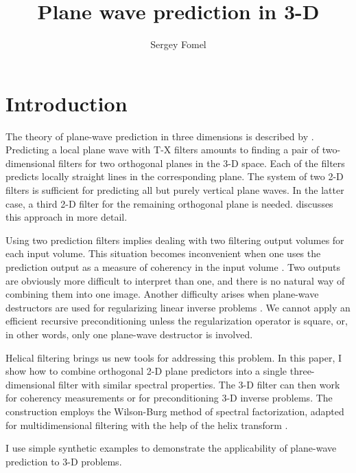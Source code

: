 
\title{Plane wave prediction in 3-D}


\author{Sergey Fomel}

\shortpaper
\maketitle

\section{Introduction}

The theory of plane-wave prediction in three dimensions is described
by \cite{Claerbout.sep.77.19,gee}. Predicting a local plane wave with
T-X filters amounts to finding a pair of two-dimensional filters
for two orthogonal planes in the 3-D space.  Each of the filters
predicts locally straight lines in the corresponding plane. The system
of two 2-D filters is sufficient for predicting all but purely
vertical plane waves. In the latter case, a third 2-D filter for the
remaining orthogonal plane is needed.  \cite{Schwab.sepphd.99}
discusses this approach in more detail.
\par
Using two prediction filters implies dealing with two filtering output
volumes for each input volume. This situation becomes inconvenient
when one
uses the prediction output as a measure of coherency in the input
volume \cite[]{Claerbout.sep.77.19,Schwab.sep.92.29}. Two outputs are
obviously more difficult to interpret than one, and there is no
natural way of combining them into one image. Another difficulty
arises when plane-wave destructors are used for regularizing linear
inverse problems \cite[]{Clapp.sep.95.bob1}. We cannot
apply an efficient recursive preconditioning
\cite[]{Claerbout.sep.97.jon2} unless the regularization operator is
square, or, in other words, only one plane-wave destructor is involved.
\par
Helical filtering \cite[]{GEO63-05-15321541} brings us new tools for
addressing this problem. In this paper, I show how to combine
orthogonal 2-D plane predictors into a single three-dimensional filter
with similar spectral properties. The 3-D filter can then work for
coherency measurements or for preconditioning 3-D inverse problems.
The construction employs the Wilson-Burg method of spectral
factorization, adapted for multidimensional filtering with the help of
the helix transform \cite[]{Sava.sep.97.paul1}.
\par
I use simple synthetic examples to demonstrate the applicability of 
plane-wave prediction to 3-D problems.

